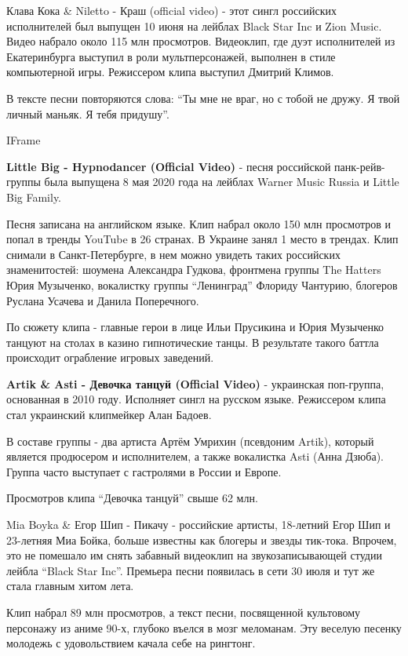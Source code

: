 Клава Кока \& Niletto - Краш (official video) - этот сингл
российских исполнителей был выпущен 10 июня на лейблах Black Star Inc и
Zion Music. Видео набрало около 115 млн просмотров. Видеоклип, где дуэт
исполнителей из Екатеринбурга выступил в роли мультперсонажей, выполнен в
стиле компьютерной игры. Режиссером клипа выступил Дмитрий Климов. 

В тексте песни повторяются слова: \enquote{Ты мне не враг, но с тобой не дружу. Я
твой личный маньяк. Я тебя придушу}. 

IFrame

\textbf{Little Big - Hypnodancer (Official Video)} - песня
российской панк-рейв-группы была выпущена 8 мая 2020 года на лейблах
Warner Music Russia и Little Big Family. 

Песня записана на английском языке. Клип набрал около 150 млн просмотров и
попал в тренды YouTube в 26 странах. В Украине занял 1 место в трендах.  Клип
снимали в Санкт-Петербурге, в нем можно увидеть таких российских знаменитостей:
шоумена Александра Гудкова, фронтмена группы The Hatters Юрия Музыченко,
вокалистку группы \enquote{Ленинград} Флориду Чантурию, блогеров Руслана
Усачева и Данила Поперечного. 

По сюжету клипа - главные герои в лице Ильи Прусикина и Юрия Музыченко танцуют
на столах в казино гипнотические танцы. В результате такого баттла происходит
ограбление игровых заведений. 

\textbf{Artik \& Asti - Девочка танцуй (Official Video)} - украинская поп-группа,
основанная в 2010 году. Исполняет сингл на русском языке. Режиссером клипа
стал украинский клипмейкер Алан Бадоев.

В составе группы - два артиста Артём Умрихин (псевдоним Artik), который
является продюсером и исполнителем, а также вокалистка Asti (Анна Дзюба).
Группа часто выступает с гастролями в России и Европе. 

Просмотров клипа \enquote{Девочка танцуй} свыше 62 млн. 


Mia Boyka \& Егор Шип - Пикачу - российские артисты, 18-летний Егор Шип
и 23-летняя Миа Бойка, больше известны как блогеры и звезды тик-тока.
Впрочем, это не помешало им снять забавный видеоклип на звукозаписывающей
студии лейбла \enquote{Black Star Inc}. Премьера песни появилась в сети 30 июля и
тут же стала главным хитом лета.

Клип набрал 89 млн просмотров, а текст песни, посвященной культовому
персонажу из аниме 90-х, глубоко въелся в мозг меломанам. Эту веселую
песенку молодежь с удовольствием качала себе на рингтонг.

